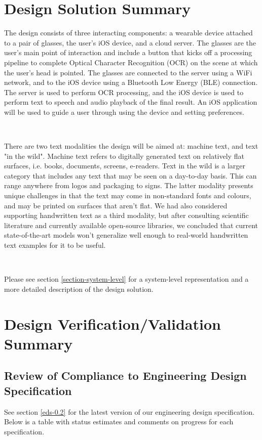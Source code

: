\documentclass[a4paper,11pt]{article}
\begin{document}
\section{Design Solution Summary}
\noindent
The design consists of three interacting components: a wearable device attached to a pair of glasses, the user's iOS device, and a cloud server. The glasses are the user's main point of interaction and include a button that kicks off a processing pipeline to complete Optical Character Recognition (OCR) on the scene at which the user's head is pointed. The glasses are connected to the server using a WiFi network, and to the iOS device using a Bluetooth Low Energy (BLE) connection. The server is used to perform OCR processing, and the iOS device is used to perform text to speech and audio playback of the final result. An iOS application will be used to guide a user through using the device and setting preferences.

\

\noindent
There are two text modalities the design will be aimed at: machine text, and text "in the wild". Machine text refers to digitally generated text on relatively flat surfaces, i.e. books, documents, screens, e-readers. Text in the wild is a larger category that includes any text that may be seen on a day-to-day basis. This can range anywhere from logos and packaging to signs. The latter modality presents unique challenges in that the text may come in non-standard fonts and colours, and may be printed on surfaces that aren't flat. We had also considered supporting handwritten text as a third modality, but after consulting scientific literature and currently available open-source libraries, we concluded that current state-of-the-art models won't generalize well enough to real-world handwritten text examples for it to be useful.

\

\noindent
Please see section \ref{section-system-level} for a system-level representation and a more detailed description of the design solution.

\newpage
\section{Design Verification/Validation Summary}
\subsection{Review of Compliance to Engineering Design Specification}
See section \ref{eds-0.2} for the latest version of our engineering design specification. Below is a table with status estimates and comments on progress for each specification.
\end{document}
